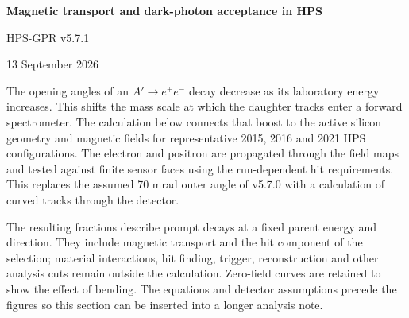 \documentclass[11pt,letterpaper]{article}
\begin{document}
{\Large\bfseries Magnetic transport and dark-photon acceptance in HPS}\par
{\large HPS-GPR v5.7.1}\par
13 September 2026

The opening angles of an $A'\to e^+e^-$ decay decrease as its laboratory
energy increases. This shifts the mass scale at which the daughter tracks
enter a forward spectrometer. The calculation below connects that boost to
the active silicon geometry and magnetic fields for representative 2015,
2016 and 2021 HPS configurations. The electron and positron are propagated
through the field maps and tested against finite sensor faces using the
run-dependent hit requirements. This replaces the assumed 70 mrad outer
angle of v5.7.0 with a calculation of curved tracks through the detector.

The resulting fractions describe prompt decays at a fixed parent energy and
direction. They include magnetic transport and the hit component of the
selection; material interactions, hit finding, trigger, reconstruction and
other analysis cuts remain outside the calculation. Zero-field curves are
retained to show the effect of bending. The equations and detector assumptions
precede the figures so this section can be inserted into a longer analysis note.


\clearpage

\end{document}

